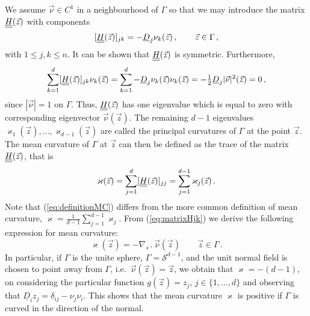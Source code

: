 We assume $\vec{\nu} \in C^1$ in a neighbourhood of $\Gamma$ so that we
may introduce the matrix $\mat H(\vec z)$ with components
\begin{equation}\label{eq:matrixHjk}
[\mat H (\vec z)]_{jk} = - \underline{D}_j \nu_k (\vec z)\,, \qquad \vec z \in
\Gamma \, ,
\end{equation}
with $1\leq j,k\leq n$. It can be shown that $\mat H(\vec z)$ is symmetric.
Furthermore,
\begin{equation}
\sum_{k = 1}^{d} [\mat H(\vec z)]_{jk} \nu_k (\vec z) =
\sum_{k = 1}^{d} - \underline{D}_j \nu_k (\vec z) \nu_k (\vec z) =
- \tfrac{1}{2} \underline{D}_j |\vec{\nu}|^2 (\vec z) = 0 \, ,
\end{equation}
since $|\vec{\nu}| = 1$ on $\Gamma$. Thus, $\mat H(\vec z)$ has one
eigenvalue which is equal to zero with corresponding eigenvector
$\vec\nu(\vec z)$. The remaining $d - 1$ eigenvalues $\varkappa_1 (\vec z),
\hdots, \varkappa_{d - 1} (\vec z)$ are called the principal curvatures of
$\Gamma$ at the point $\vec z$. The mean curvature of $\Gamma$ at $\vec z$
can then be defined as the trace of the matrix $\mat H(\vec z)$, that is
\begin{equation}\label{eq:definitionMC}
\varkappa (\vec z) = \sum_{j = 1}^{d} [\mat H(\vec z)]_{jj} = \sum_{j = 1}^{d -
1} \varkappa_j (\vec z) \,.
\end{equation}
Note that (\ref{eq:definitionMC}) differs from the more common
definition of mean curvature,
$\varkappa = \frac{1}{d - 1} \sum_{j = 1}^{d - 1} \varkappa_j$.
From (\ref{eq:matrixHjk}) we derive the following expression for mean
curvature:
\begin{equation}\label{eq:definition2MC}
\varkappa (\vec z)=-\nabla_s \,.\, \vec{\nu}(\vec z) \qquad \vec z \in \Gamma\,.
\end{equation}
In particular, if $\Gamma$ is the unite sphere, $\Gamma = \mathcal{S}^{d - 1}$,
and the unit normal field is chosen to point away from $\Gamma$,
i.e.~$\vec\nu(\vec z) = \vec z$, we obtain that $\varkappa = -
(d - 1)$, on considering the particular function $g(\vec z) = z_j$, $j \in \{
1, \hdots, d \}$ and observing that $\underline{D}_i z_j = \delta_{ij} - \nu_j
\nu_i$. This shows that the mean curvature $\varkappa$ is positive if $\Gamma$
is curved in the direction of the normal.

